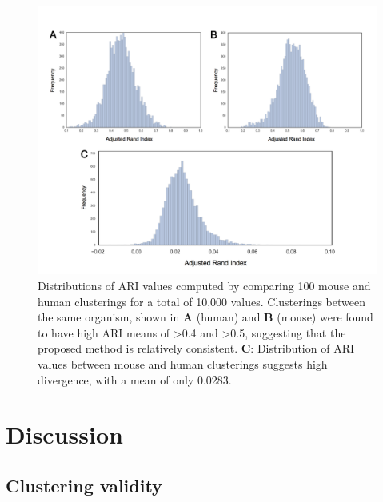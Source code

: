 \documentclass[12pt,oneside,onecolumn,a4paper]{article}
\begin{document}
\begin{figure}[H]
\begin{center}
\includegraphics[width=\columnwidth]{figures/ari_dist}
\caption{Distributions of ARI values computed by comparing 100 mouse and human clusterings for a total of 10,000 values. Clusterings between the same organism, shown in \textbf{A} (human) and \textbf{B} (mouse) were found to have high ARI means of \textgreater 0.4 and \textgreater 0.5, suggesting that the proposed method is relatively consistent. \textbf{C}: Distribution of ARI values between mouse and human clusterings suggests high divergence, with a mean of only 0.0283. \label{fig:ARI_table}%
}
\end{center}
\end{figure}

\section{Discussion}

\subsection{Clustering validity}
\end{document}
